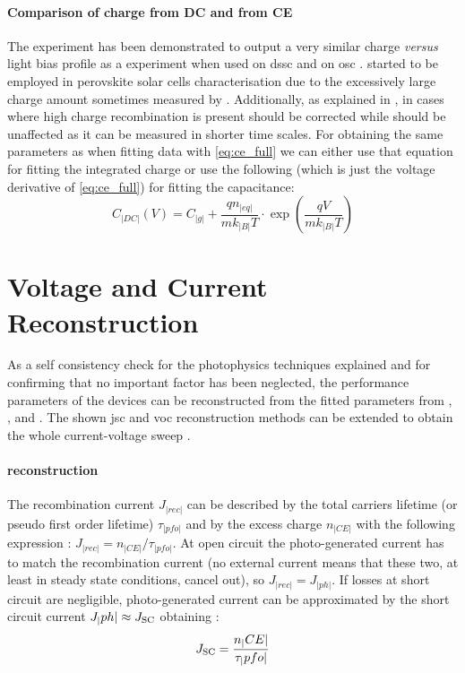 	\paragraph{Comparison of charge from DC and from CE}
	The  experiment has been demonstrated to output a very similar charge \textsl{versus} light bias profile as a  experiment when used on \gls{dssc} \cite{ORegan2005,Barnes2013} and on \gls{osc} \cite{Shuttle2008a}.
	 started to be employed in perovskite solar cells characterisation due to the excessively large charge amount sometimes measured by  \cite{Wheeler2017,ORegan2015b}.
	Additionally, as explained in , in cases where high charge recombination is present  should be corrected while  should be unaffected as it can be measured in shorter time scales.
	For obtaining the same parameters as when fitting  data with \cref{eq:ce_full} we can either use that equation for fitting the integrated charge or use the following (which is just the voltage derivative of \cref{eq:ce_full}) for fitting the capacitance:
	\begin{equation}\label{eq:dc_full}
		C_|DC|(V) = C_|g| + \frac{qn_|eq|}{mk_|B|T} \cdot \exp(\frac{qV}{mk_|B|T})
	\end{equation}

	\FloatBarrier
	\newpage
\section{Voltage and Current Reconstruction}
	As a self consistency check for the photophysics techniques explained and for confirming that no important factor has been neglected, the performance parameters of the devices can be reconstructed from the fitted parameters from , , and .
	The shown \gls{jsc} and \gls{voc} reconstruction methods can be extended to obtain the whole current-voltage sweep \cite{Maurano2011}.

	\paragraph{ reconstruction}\label{jsc_reconstruction}
	The recombination current $J_|rec|$ can be described by the total carriers lifetime (or pseudo first order lifetime) $\tau_|pfo|$ and by the excess charge $n_|CE|$ with the following expression \cite{Wheeler2017,Du2018}: $J_|rec| = n_|CE| / \tau_|pfo|$.
	At open circuit the photo\hyp{}generated current has to match the recombination current (no external current means that these two, at least in steady state conditions, cancel out), so $J_|rec| = J_|ph|$.
	If losses at short circuit are negligible, photo\hyp{}generated current can be approximated by the short circuit current $J_|ph| \approx J_\mathrm{SC}$ obtaining \cite{ORegan2015b}:
	\begin{equation}\label{eq:reconstruction_jsc}
		J_\mathrm{SC} = \frac{n_|CE|}{\tau_|pfo|}
	\end{equation}

